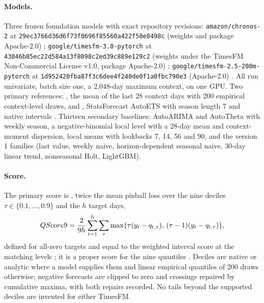 \paragraph{Models.} Three frozen foundation models with exact repository revisions:
\texttt{amazon/chronos-2} at \texttt{29ec3766d36d6f73f0696f85560a422f50e8498c} (weights and package
Apache-2.0) \citep{chronos2-weights, chronos2-2025};
\texttt{google/timesfm-3.0-pytorch} at \texttt{43046b85ec22d584a13f8098c2ed39c889e129c2} (weights under the
TimesFM Non-Commercial License v1.0, package Apache-2.0) \citep{timesfm3-card, timesfm-license};
\texttt{google/timesfm-2.5-200m-pytorch} at \texttt{1d952420fba87f3c6dee4f240de0f1a0fbc790e3} (Apache-2.0)
\citep{timesfm25-card}. All run univariate, batch size one, a 2,048-day maximum context, on one GPU. Two
primary references: \lm{}, the mean of the last 28 context days with 200 empirical context-level draws, and
\aets{}, StatsForecast AutoETS with season length 7 and native intervals \citep{statsforecast-2.1.1}. Thirteen
secondary baselines: AutoARIMA and AutoTheta with weekly season, a negative-binomial local level with a 28-day
mean and context-moment dispersion, local means with lookbacks 7, 14, 56 and 90, and the version 1 families
(last value, weekly naive, horizon-dependent seasonal naive, 30-day linear trend, nonseasonal Holt, LightGBM).

\paragraph{Score.} The primary score is \qs{}, twice the mean pinball loss over the nine deciles
$\tau \in \{0.1, \dots, 0.9\}$ and the $h$ target days,
\[
QScore9{} = \frac{2}{9h} \sum_{t=1}^{h} \sum_{\tau} \max\{\tau (y_t - q_{t,\tau}),\, (\tau - 1)(y_t - q_{t,\tau})\},
\]
defined for all-zero targets and equal to the weighted interval score at the matching levels
\citep{bracher2021}; it is a proper score for the nine quantiles \citep{gneiting2007}. Deciles are native or
analytic where a model supplies them and linear empirical quantiles of 200 draws otherwise; negative
forecasts are clipped to zero and crossings repaired by cumulative maxima, with both repairs recorded. No
tails beyond the supported deciles are invented for either TimesFM.

